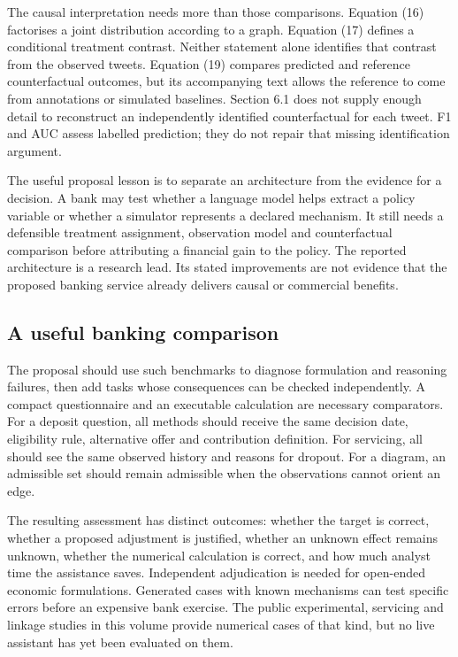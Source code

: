 The causal interpretation needs more than those comparisons. Equation (16)
factorises a joint distribution according to a graph. Equation (17) defines
a conditional treatment contrast. Neither statement alone identifies that
contrast from the observed tweets. Equation (19) compares predicted and
reference counterfactual outcomes, but its accompanying text allows the
reference to come from annotations or simulated baselines. Section 6.1 does
not supply enough detail to reconstruct an independently identified
counterfactual for each tweet. F1 and AUC assess labelled prediction; they
do not repair that missing identification argument.

The useful proposal lesson is to separate an architecture from the evidence
for a decision. A bank may test whether a language model helps extract a
policy variable or whether a simulator represents a declared mechanism.
It still needs a defensible treatment assignment, observation model and
counterfactual comparison before attributing a financial gain to the policy.
The reported architecture is a research lead. Its stated improvements are
not evidence that the proposed banking service already delivers causal or
commercial benefits.

\subsection{A useful banking comparison}
The proposal should use such benchmarks to diagnose formulation and reasoning
failures, then add tasks whose consequences can be checked independently.
A compact questionnaire and an executable calculation are necessary
comparators. For a deposit question, all methods should receive the same
decision date, eligibility rule, alternative offer and contribution definition.
For servicing, all should see the same observed history and reasons for
dropout. For a diagram, an admissible set should remain admissible when the
observations cannot orient an edge.

The resulting assessment has distinct outcomes: whether the target is correct,
whether a proposed adjustment is justified, whether an unknown effect remains
unknown, whether the numerical calculation is correct, and how much analyst
time the assistance saves. Independent adjudication is needed for open-ended
economic formulations. Generated cases with known mechanisms can test
specific errors before an expensive bank exercise. The public experimental,
servicing and linkage studies in this volume provide numerical cases of that
kind, but no live assistant has yet been evaluated on them.

